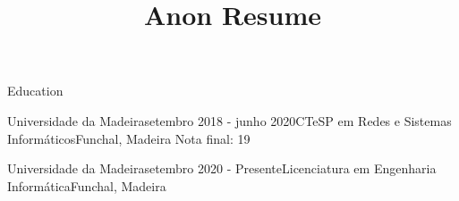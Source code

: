 \documentclass{resume} %
\begin{document}
\title{Anon Resume}

\begin{rSection}{Education}

\begin{rSubsection}{Universidade da Madeira}{setembro 2018 - junho 2020}{CTeSP em Redes e Sistemas Informáticos}{Funchal, Madeira}
Nota final: 19
\vspace{-.65cm}
\item[]
\end{rSubsection}

\begin{rSubsection}{Universidade da Madeira}{setembro 2020 - Presente}{Licenciatura em Engenharia Informática}{Funchal, Madeira}
    \vspace{-.65cm}
    \item[]
    \end{rSubsection}
\end{rSection}

\end{document}
